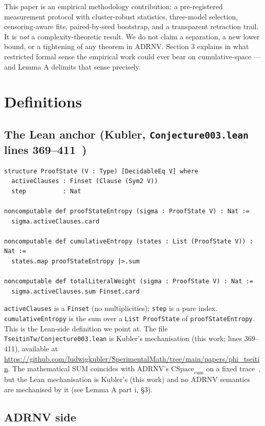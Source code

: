 \documentclass[11pt,a4paper]{article}
\theoremstyle{remark}
\begin{document}
This paper is an empirical methodology contribution: a pre-registered
measurement protocol with cluster-robust statistics, three-model selection,
censoring-aware fits, paired-by-seed bootstrap, and a transparent
retraction trail. It is \emph{not} a complexity-theoretic result. We do
not claim a separation, a new lower bound, or a tightening of any theorem
in ADRNV. Section 3 explains in what restricted formal sense the empirical
work could ever bear on cumulative-space --- and Lemma A delimits that
sense precisely.

\section{Definitions}

\subsection{The Lean anchor (Kubler, \texttt{Conjecture003.lean} lines 369--411~\cite{KublerSperimentalMath,Mathlib2020})}

\begin{lstlisting}[language=lean]
structure ProofState (V : Type) [DecidableEq V] where
  activeClauses : Finset (Clause (Sym2 V))
  step          : Nat

noncomputable def proofStateEntropy (sigma : ProofState V) : Nat :=
  sigma.activeClauses.card

noncomputable def cumulativeEntropy (states : List (ProofState V)) : Nat :=
  states.map proofStateEntropy |>.sum

noncomputable def totalLiteralWeight (sigma : ProofState V) : Nat :=
  sigma.activeClauses.sum Finset.card
\end{lstlisting}

\texttt{activeClauses} is a \texttt{Finset} (no multiplicities);
\texttt{step} is a pure index. \texttt{cumulativeEntropy} is the sum over a
\texttt{List ProofState} of \texttt{proofStateEntropy}. This is the
Lean-side definition we point at. The file
\texttt{TseitinTw/Conjecture003.lean} is Kubler's mechanisation
(this work; lines 369--411), available at
\url{https://github.com/ludwigkubler/SperimentalMath/tree/main/papers/phi_tseitin}.
The mathematical SUM coincides with ADRNV's
$\mathrm{CSpace}_{\mathrm{cum}}$ on a fixed trace~\cite{ADRNV2017}, but
the Lean mechanisation is Kubler's (this work) and no ADRNV semantics
are mechanised by it (see Lemma A part i, \S3).

\subsection{ADRNV side}
\end{document}
